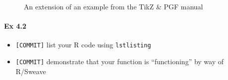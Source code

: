 \documentclass[12pt]{article}
\begin{document}
\begin{figure}[h!]
    \centering
{}
\caption{An extension of an example from the TikZ \& PGF manual \cite{tikzManual2012-11-04}}
\label{fig:examplefrommanual}
\end{figure}


\paragraph{Ex 4.2}
\begin{itemize}
    \item \verb+[COMMIT]+ list your R code using \verb+lstlisting+ 
    \item \verb+[COMMIT]+ demonstrate that your function is ``functioning'' by way of R/Sweave
\end{itemize}
\end{document}
